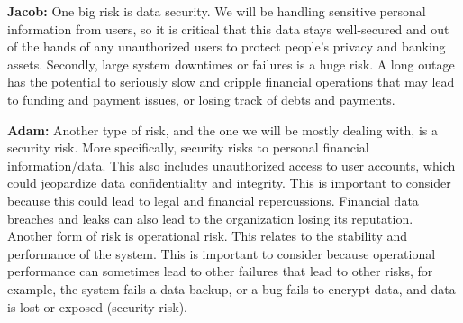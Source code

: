 \documentclass{article}
\begin{document}
\begin{enumerate}
    \textbf{Jacob:} One big risk is data security. We will be handling sensitive personal information from users, so it is critical that this data stays well-secured and out of the hands of any unauthorized users to protect people's privacy and banking assets. Secondly, large system downtimes or failures is a huge risk. A long outage has the potential to seriously slow and cripple financial operations that may lead to funding and payment issues, or losing track of debts and payments.

    \textbf{Adam:} Another type of risk, and the one we will be mostly dealing with, is a security risk. More specifically, security risks to personal financial information/data. This also includes unauthorized access to user accounts, which could jeopardize data confidentiality and integrity. This is important to consider because this could lead to legal and financial repercussions. Financial data breaches and leaks can also lead to the organization losing its reputation. Another form of risk is operational risk. This relates to the stability and performance of the system. This is important to consider because operational performance can sometimes lead to other failures that lead to other risks, for example, the system fails a data backup, or a bug fails to encrypt data, and data is lost or exposed (security risk).
\end{enumerate}
\end{document}
